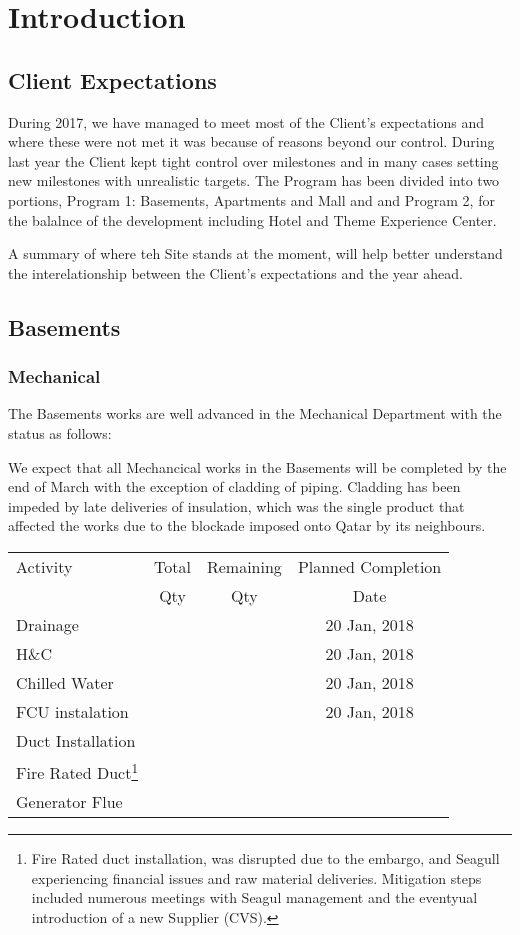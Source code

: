 \chapter{Introduction}

\section{Client Expectations}

During 2017, we have managed to meet most of the Client's expectations and where these were not met it was because of reasons beyond our control. During last year the Client kept tight control over milestones and in many cases setting new milestones with unrealistic targets. The Program has been divided into two portions, Program 1: Basements, Apartments and Mall and and Program 2, for the balalnce of the development including Hotel and Theme Experience Center.

A summary of where teh Site stands at the moment, will help better understand the interelationship between the Client's expectations and the year ahead.

\section{Basements}


\subsection{Mechanical} 

The Basements works are well advanced in the Mechanical Department with the status as follows:


We expect that all Mechancical works in the Basements will be completed by the end of March with the exception of cladding of piping. Cladding has been impeded by late deliveries of insulation, which was the single product that affected the works due to the blockade imposed onto Qatar by its neighbours.


\begin{longtable}{l c c c}
\toprule
Activity  & Total & Remaining & Planned Completion\\ 
          & Qty & Qty  & Date\\ 
          \midrule
Drainage  &     &    & 20 Jan, 2018 \\
H\&C      &     &    & 20  Jan, 2018\\
Chilled Water & &    & 20 Jan, 2018\\
FCU instalation & & & 20 Jan, 2018\\
Duct Installation & & & \\
Fire Rated Duct\footnote{Fire Rated duct installation, was disrupted due to the embargo, and Seagull experiencing financial issues and raw material deliveries. Mitigation steps included numerous meetings with Seagul management and the eventyual introduction of  a new Supplier (CVS).} & & &\\
Generator Flue & & &\\
\bottomrule
\end{longtable}

